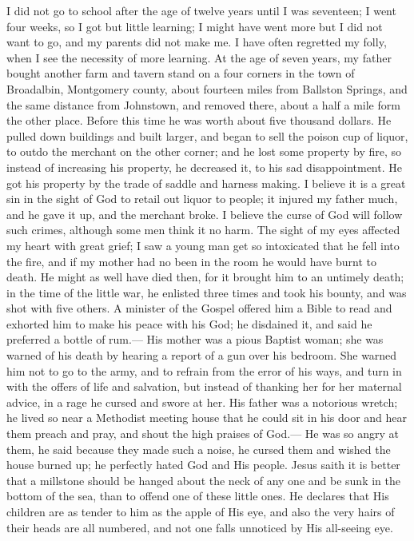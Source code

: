 \documentclass{article}
\begin{document}
I did not go to school after the age of twelve years until I was seventeen; I went four weeks, so I got but little learning; I might have went more but I did not want to go, and my parents did not make me.
I have often regretted my folly, when I see the necessity of more learning.
At the age of seven years, my father bought another farm and tavern stand on a four corners in the town of Broadalbin, Montgomery county, about fourteen miles from Ballston Springs, and the same distance from Johnstown, and removed there, about a half a mile form the other place.
Before this time he was worth about five thousand dollars.
He pulled down buildings and built larger, and began to sell the poison cup of liquor, to outdo the merchant on the other corner; and he lost some property by fire, so instead of increasing his property, he decreased it, to his sad disappointment.
He got his property by the trade of saddle and harness making.
I believe it is a great sin in the sight of God to retail out liquor to people; it injured my father much, and he gave it up, and the merchant broke.
I believe the curse of God will follow such crimes, although some men think it no harm.
The sight of my eyes affected my heart with great grief; I saw a young man get so intoxicated that he fell into the fire, and if my mother had no been in the room he would have burnt to death.
He might as well have died then, for it brought him to an untimely death; in the time of the little war, he enlisted three times and took his bounty, and was shot with five others.
A minister of the Gospel offered him a Bible to read and exhorted him to make his peace with his God; he disdained it, and said he preferred a bottle of rum.---
His mother was a pious Baptist woman; she was warned of his death by hearing a report of a gun over his bedroom.
She warned him not to go to the army, and to refrain from the error of his ways, and turn in with the offers of life and salvation, but instead of thanking her for her maternal advice, in a rage he cursed and swore at her.
His father was a notorious wretch; he lived so near a Methodist meeting house that he could sit in his door and hear them preach and pray, and shout the high praises of God.---
He was so angry at them, he said because they made such a noise, he cursed them and wished the house burned up; he perfectly hated God and His people.
Jesus saith it is better that a millstone should be hanged about the neck of any one and be sunk in the bottom of the sea, than to offend one of these little ones.
He declares that His children are as tender to him as the apple of His eye, and also the very hairs of their heads are all numbered, and not one falls unnoticed by His all-seeing eye.
\end{document}
